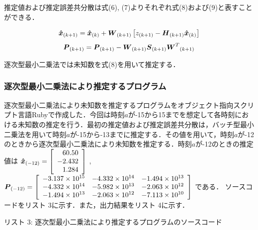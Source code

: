 \documentclass[a4paper]{jarticle}
\begin{document}
推定値および推定誤差共分散は式(6), (7)よりそれぞれ式(8)および(9)と表すことができる．

\begin{equation}
\mbox{\boldmath $\hat{x}$}_{(k+1)} =
\mbox{\boldmath $\hat{x}$}_{(k)}+
\mbox{\boldmath ${W}$}_{(k+1)}
\left[ 
z_{(k+1)}-
\mbox{\boldmath $H$}_{(k+1)} 
\mbox{\boldmath $\hat{x}$}_{(k)}
\right]
\vspace{3mm}
\end{equation}
\begin{equation}
\mbox{\boldmath $P$}_{(k+1)} =
\mbox{\boldmath $P$}_{(k+1)}-
\mbox{\boldmath ${W}$}_{(k+1)}
\mbox{\boldmath ${S}$}_{(k+1)}
{\mbox{\boldmath ${W}$}^{T}}_{(k+1)}
\vspace{3mm}
\end{equation}

逐次型最小二乗法では未知数を式(8)を用いて推定する．

\subsubsection{逐次型最小二乗法により推定するプログラム}
逐次型最小二乗法により未知数を推定するプログラムをオブジェクト指向スクリプト言語Rubyで作成した．今回は時刻$a$が-15から15までを想定して各時刻における未知数の推定を行う．最初の推定値および推定誤差共分散は，バッチ型最小二乗法を用いて時刻$a$が-15から-13までに推定する．その値を用いて，時刻$a$が-12のときから逐次型最小二乗法により未知数を推定する．時刻$a$が-12のときの推定値は
\( \mbox{\boldmath $\hat{x}$}_{(-12)}= 
\left[
\begin{array}{r}
{60.50} \\ {-2.432} \\{1.284} \\ 
\end{array}
\right]
\) , 
\(
 \mbox{\boldmath $P$}_{(-12)}= 
\left[
\begin{array}{rrr}
-3.137\times{10}^{15} & -4.332\times{10}^{14} & -1.494\times{10}^{13}\\ 
-4.332\times{10}^{14} & -5.982\times{10}^{13} & -2.063\times{10}^{12}\\
-1.494\times{10}^{13} & -2.063\times{10}^{12} & -7.113\times{10}^{10} \\ 
\end{array}
\right]
\)
である．
ソースコードをリスト 3に示す．また，出力結果をリスト 4に示す．

\newpage
\vspace{3mm}
\begin{center}
リスト 3: 逐次型最小二乗法により推定するプログラムのソースコード
\begin{small}
\vspace{3mm}
\end{small}
\vspace{3mm}
\end{center}
\end{document}
